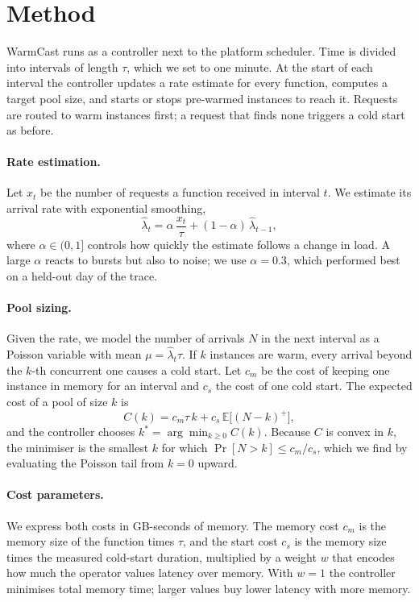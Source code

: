 \section{Method}
\label{sec:method}

WarmCast runs as a controller next to the platform scheduler. Time is divided
into intervals of length $\tau$, which we set to one minute. At the start of
each interval the controller updates a rate estimate for every function,
computes a target pool size, and starts or stops pre-warmed instances to
reach it. Requests are routed to warm instances first; a request that finds
none triggers a cold start as before.

\paragraph{Rate estimation.}
Let $x_t$ be the number of requests a function received in interval $t$. We
estimate its arrival rate with exponential smoothing,
\begin{equation}
  \hat{\lambda}_t = \alpha \, \frac{x_t}{\tau} + (1 - \alpha) \, \hat{\lambda}_{t-1},
  \label{eq:ewma}
\end{equation}
where $\alpha \in (0, 1]$ controls how quickly the estimate follows a change
in load. A large $\alpha$ reacts to bursts but also to noise; we use
$\alpha = 0.3$, which performed best on a held-out day of the trace.

\paragraph{Pool sizing.}
Given the rate, we model the number of arrivals $N$ in the next interval as a
Poisson variable with mean $\mu = \hat{\lambda}_t \tau$. If $k$ instances are
warm, every arrival beyond the $k$-th concurrent one causes a cold start. Let
$c_m$ be the cost of keeping one instance in memory for an interval and $c_s$
the cost of one cold start. The expected cost of a pool of size $k$ is
\begin{equation}
  C(k) = c_m \tau \, k + c_s \, \mathbb{E}\big[(N - k)^{+}\big],
  \label{eq:cost}
\end{equation}
and the controller chooses $k^{*} = \arg\min_{k \ge 0} C(k)$. Because $C$ is
convex in $k$, the minimiser is the smallest $k$ for which
$\Pr[N > k] \le c_m / c_s$, which we find by evaluating the Poisson tail from
$k = 0$ upward.

\paragraph{Cost parameters.}
We express both costs in GB-seconds of memory. The memory cost $c_m$ is the
memory size of the function times $\tau$, and the start cost $c_s$ is the
memory size times the measured cold-start duration, multiplied by a weight
$w$ that encodes how much the operator values latency over memory. With
$w = 1$ the controller minimises total memory time; larger values buy lower
latency with more memory.

